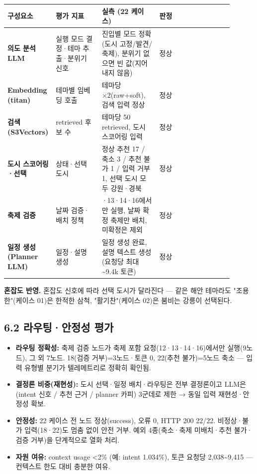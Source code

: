 \documentclass[11pt,a4paper]{article}
\newcommand{\DocNeedspace}[1]{\par\ifdim\dimexpr\pagegoal-\pagetotal\relax<#1\newpage\fi}
\providecommand{\tightlist}{\setlength{\itemsep}{0pt}\setlength{\parskip}{0pt}}
\begin{document}
\begin{scriptsize}
\begin{longtable}{@{}>{\RaggedRight\arraybackslash}m{0.130\linewidth}>{\RaggedRight\arraybackslash}m{0.200\linewidth}>{\RaggedRight\arraybackslash}m{0.250\linewidth}>{\RaggedRight\arraybackslash}m{0.320\linewidth}@{}}
\toprule\noalign{}
구성요소 & 평가 지표 & 실측 (22 케이스) & 판정 \\
\midrule\noalign{}
\endhead
\bottomrule\noalign{}
\endlastfoot
\textbf{의도 분석 LLM} & 실행 모드 결정·테마 추출·분위기 신호 & 진입별 모드 정확(도시 고정/발견/축제), 분위기 없으면 빈 값(지어내지 않음) & 정상 \\
\textbf{Embedding (titan)} & 테마별 임베딩 호출 & 테마당 ×2(raw+soft), 검색 입력 정상 & 정상 \\
\textbf{검색 (S3Vectors)} & retrieved 후보 수 & 테마당 50 retrieved, 도시 스코어링 입력 & 정상 \\
\textbf{도시 스코어링·선택} & 상태·선택 도시 & 정상 추천 17 / 축소 3 / 추천 불가 1 / 입력 거부 1, 선택 도시 모두 강원·경북 & 정상 \\
\textbf{축제 검증} & 날짜 검증·배치 정책 & 12·13·14·16에서만 실행, 날짜 확정 축제만 배치, 미확정은 제외 & 정상 \\
\textbf{일정 생성(Planner LLM)} & 일정·설명 생성 & 일정 생성 완료, 설명 텍스트 생성(요청당 최대 \textasciitilde9.4k 토큰) & 정상 \\
\end{longtable}
\end{scriptsize}

\textbf{혼잡도 반영.} 혼잡도 신호에 따라 선택 도시가 달라진다 --- 같은 해안 테마라도 "조용한"(케이스 01)은 한적한 삼척, "활기찬"(케이스 02)은 붐비는 강릉이 선택된다.

\DocNeedspace{6\baselineskip}
\subsection*{6.2 라우팅·안정성 평가}

\begin{itemize}
\tightlist
\item
  \textbf{라우팅 정확성:} 축제 검증 노드가 축제 포함 요청(12·13·14·16)에서만 실행(9노드), 그 외 7노드. 18(검증 거부)=3노드·토큰 0, 22(추천 불가)=5노드 축소 --- 입력 유형별 분기가 텔레메트리로 정확히 확인됨.
\item
  \textbf{결정론 비중(재현성):} 도시 선택·일정 배치·라우팅은 전부 결정론이고 LLM은 (intent 신호 / 추천 근거 / planner 카피) 3군데로 제한 → 동일 입력 재현성·안정성 확보.
\item
  \textbf{안정성:} 22 케이스 전 노드 정상(success), 오류 0, HTTP 200 22/22. 비정상·불가 입력(18·22)도 멈춤 없이 안전 거부. 예외 4종(축소·축제 미배치·추천 불가·검증 거부)을 단계적으로 열화 처리.
\item
  \textbf{자원 여유:} context usage \textless2\% (예: intent 1.034\%), 토큰 요청당 2,038\textasciitilde9,415 --- 컨텍스트 한도 대비 충분한 여유.
\end{itemize}
\end{document}
